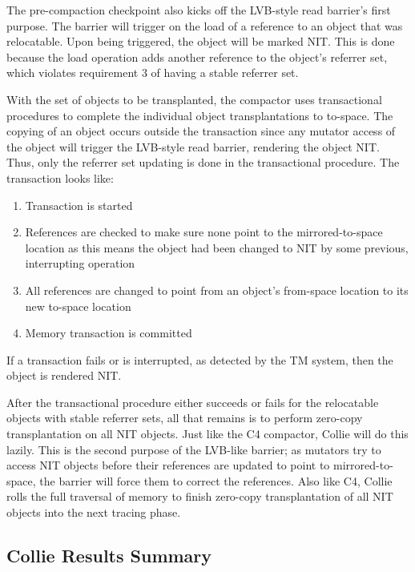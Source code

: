 \documentclass{sig-alternate}
\begin{document}
The pre-compaction checkpoint also kicks off the LVB-style read barrier's first purpose. 
The barrier will trigger on the load of a reference to an object that was 
relocatable. Upon being triggered, the object will be marked NIT. This is done because
the load operation adds another reference to the object's referrer set, which violates
requirement 3 of having a stable referrer set.

With the set of objects to be transplanted, the compactor uses transactional
procedures to complete the individual object transplantations to to-space.
The copying of an object occurs outside the transaction since any
mutator access of the object will trigger the LVB-style read barrier,
rendering the object NIT. Thus, only the referrer set updating
is done in the transactional procedure. The transaction looks like:
\begin{enumerate}
\item Transaction is started
\item References are checked to make sure none point to the mirrored-to-space location as this means the object had been changed to NIT by some previous, interrupting operation
\item All references are changed to point from an object's from-space location to its new to-space location
\item Memory transaction is committed
\end{enumerate}
If a transaction fails or is interrupted, as detected by the TM system, then the object is rendered NIT.

After the transactional procedure either succeeds or fails for the 
relocatable objects with stable referrer sets, all that remains is to perform zero-copy transplantation
on all NIT objects. Just like the C4 compactor, Collie will do this lazily. This is the second purpose
of the LVB-like barrier; as mutators try to access NIT objects before their references are updated to
point to mirrored-to-space, the barrier will force them to correct the references. Also like C4, Collie
rolls the full traversal of memory to finish zero-copy transplantation of all NIT objects into the next
tracing phase.


\subsection{Collie Results Summary}
\label{sec:collieResults}

\end{document}
